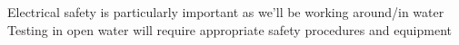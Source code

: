 Electrical safety is particularly important as we'll be working around/in water\\

Testing in open water will require appropriate safety procedures and equipment\\